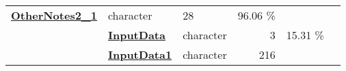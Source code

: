 \documentclass[]{article}
\begin{document}
\begin{longtable}[]{@{}lllrcl@{}}
\begin{minipage}[t]{0.35\columnwidth}
\textbf{\protect\hyperlink{othernotes2_1}{OtherNotes2\_1}}\strut
\end{minipage} & \begin{minipage}[t]{0.11\columnwidth}\raggedright\strut
character\strut
\end{minipage} & \begin{minipage}[t]{0.10\columnwidth}\raggedleft\strut
28\strut
\end{minipage} & \begin{minipage}[t]{0.10\columnwidth}\centering\strut
96.06 \%\strut
\end{minipage} & \begin{minipage}[t]{0.12\columnwidth}\raggedright\strut
\strut
\end{minipage}\tabularnewline
\begin{minipage}[t]{0.07\columnwidth}\raggedright\strut
\strut
\end{minipage} & \begin{minipage}[t]{0.35\columnwidth}\raggedright\strut
\textbf{\protect\hyperlink{inputdata}{InputData}}\strut
\end{minipage} & \begin{minipage}[t]{0.11\columnwidth}\raggedright\strut
character\strut
\end{minipage} & \begin{minipage}[t]{0.10\columnwidth}\raggedleft\strut
3\strut
\end{minipage} & \begin{minipage}[t]{0.10\columnwidth}\centering\strut
15.31 \%\strut
\end{minipage} & \begin{minipage}[t]{0.12\columnwidth}\raggedright\strut
\strut
\end{minipage}\tabularnewline
\begin{minipage}[t]{0.07\columnwidth}\raggedright\strut
\strut
\end{minipage} & \begin{minipage}[t]{0.35\columnwidth}\raggedright\strut
\textbf{\protect\hyperlink{inputdata1}{InputData1}}\strut
\end{minipage} & \begin{minipage}[t]{0.11\columnwidth}\raggedright\strut
character\strut
\end{minipage} & \begin{minipage}[t]{0.10\columnwidth}\raggedleft\strut
216\strut
\end{minipage} & \begin{minipage}[t]{0.10\columnwidth}\centering\strut

\end{minipage}
\end{longtable}
\end{document}
